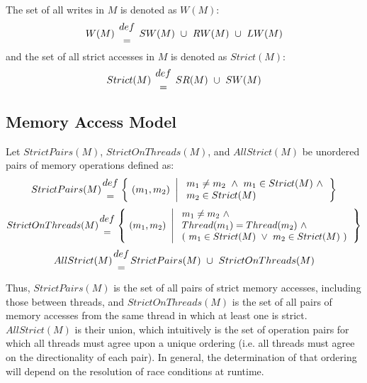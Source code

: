 \np The set of all writes in $M$ is denoted as $W(M)$:
\begin{eqnarray*}
W(M)\ {def \atop =}\ SW(M)\ \cup\ RW(M)\ \cup\ LW(M)
\end{eqnarray*}
and the set of all strict accesses in $M$ is denoted as $Strict(M)$:
\begin{eqnarray*}
Strict(M)\ {def \atop =}\ SR(M)\ \cup\ SW(M)
\end{eqnarray*}

\subsection{Memory Access Model}
\label{MemoryAccessModel}
\npf Let $StrictPairs(M)$, $StrictOnThreads(M)$, and $AllStrict(M)$
be unordered pairs of memory operations defined as:
\[
StrictPairs(M) {def \atop =} \left\{\ (m_1, m_2)\ \left|\ 
\begin{array}{l} m_1 \neq m_2\ \land\ m_1 \in Strict(M)\ \land \\
                 m_2 \in Strict(M)\ \end{array} \right. \right\} 
\]
\[
StrictOnThreads(M) {def \atop =} \left\{\ (m_1, m_2)\ \left|\ 
\begin{array}{l} m_1 \neq m_2\ \land\ \\ Thread(m_1) = Thread(m_2)\ \land \\
                 (\ m_1 \in Strict(M)\ \lor\ m_2 \in Strict(M)\ ) \end{array} \right. \right\} 
\]
\[
AllStrict(M) {def \atop =} StrictPairs(M)\ \cup\ StrictOnThreads(M)
\]

\np Thus, $StrictPairs(M)$ is the set of all pairs of strict memory 
accesses, including those between threads, and $StrictOnThreads(M)$ is
the set of all pairs of memory accesses from the same thread in which at least 
one is strict.  $AllStrict(M)$ is their union, which intuitively is the set of
operation pairs for which all threads must agree upon a unique ordering
(i.e. all threads must agree on the directionality of each pair).
In general, the determination of that ordering will depend on the resolution of 
race conditions at runtime.  

